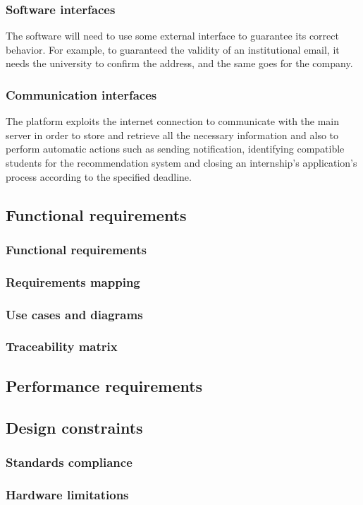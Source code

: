 \documentclass[11pt,twoside]{article}
\begin{document}
		\subsubsection{Software interfaces}
The software will need to use some external interface to guarantee its correct behavior. For example, to guaranteed the validity of an institutional email, it needs the university to confirm the address, and the same goes for the company.
		\subsubsection{Communication interfaces}
The platform exploits the internet connection to communicate with the main server in order to store and retrieve all the necessary information and also to perform automatic actions such as sending notification, identifying compatible students for the recommendation system and closing an internship's application's process according to the specified deadline.
	\subsection{Functional requirements}
		\subsubsection{Functional requirements}
		\subsubsection{Requirements mapping}
		\subsubsection{Use cases and diagrams}
		\subsubsection{Traceability matrix}
	\subsection{Performance requirements}
	\subsection{Design constraints}
		\subsubsection{Standards compliance}
		\subsubsection{Hardware limitations}
\end{document}
